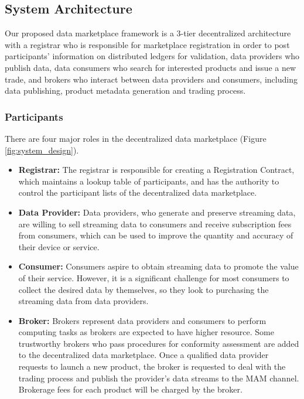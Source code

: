 \documentclass[journal,article,applsci,submit,moreauthors,pdftex]{Definitions/mdpi}
\begin{document}
\subsection{System Architecture}
Our proposed data marketplace framework is a 3-tier decentralized architecture with a registrar who is responsible for marketplace registration in order to post participants' information on distributed ledgers for validation, data providers who publish data, data consumers who search for interested products and issue a new trade, and brokers who interact between data providers and consumers, including data publishing, product metadata generation and trading process.

\subsubsection{Participants}
There are four major roles in the decentralized data marketplace (Figure \ref{fig:system_design}).

\begin{itemize}[leftmargin=*,labelsep=5.8mm]
\item \textbf{Registrar: }
The registrar is responsible for creating a Registration Contract, which maintains a lookup table of participants, and has the authority to control the participant lists of the decentralized data marketplace.
\item \textbf{Data Provider: }
Data providers, who generate and preserve streaming data, are willing to sell streaming data to consumers and receive subscription fees from consumers, which can be used to improve the quantity and accuracy of their device or service.
\item \textbf{Consumer: }
Consumers aspire to obtain streaming data to promote the value of their service. However, it is a significant challenge for most consumers to collect the desired data by themselves, so they look to purchasing the streaming data from data providers.
\item \textbf{Broker: }
Brokers represent data providers and consumers to perform computing tasks as brokers are expected to have higher resource. Some trustworthy brokers who pass procedures for conformity assessment are added to the decentralized data marketplace. Once a qualified data provider requests to launch a new product, the broker is requested to deal with the trading process and publish the provider’s data streams to the MAM channel. Brokerage fees for each product will be charged by the broker.
\end{itemize}
\end{document}

